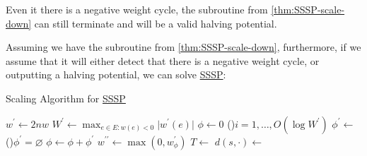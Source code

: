 \begin{note}
	Even it there is a negative weight cycle, the subroutine from \autoref{thm:SSSP-scale-down} can still terminate and will be a valid halving potential.
\end{note}

Assuming we have the subroutine from \autoref{thm:SSSP-scale-down}, furthermore, if we assume that it will either detect that there is a negative weight cycle, or outputting a halving potential, we can solve \hyperref[prb:SSSP]{SSSP}:

\begin{algorithm}[H]\label{algo:SSSP-scaling}
	\DontPrintSemicolon{}
	\caption{Scaling Algorithm for \hyperref[prb:SSSP]{SSSP}}

	\BlankLine

	\(w^{\prime} \gets 2n w\)\;
	\(W^{\prime} \gets \max _{e \in E \colon w(e) < 0} \lvert w^{\prime} (e) \rvert \)\;
	\(\phi \gets 0\)
	\;
	\For(){\(i = 1, \dots , O(\log W^{\prime} )\)}{
		\(\phi ^{\prime} \gets \)\;
		\If(){\(\phi ^{\prime} = \varnothing \)}{
			\Return{\(\bot\)}\;
		}
		\(\phi \gets \phi + \phi ^{\prime} \)
	}
	\;
	\(w^{\prime\prime} \gets \max (0, w^{\prime} _\phi )\)\;
	\(T \gets\)
	\(d(s, \cdot)\gets\)
	\;
\end{algorithm}

